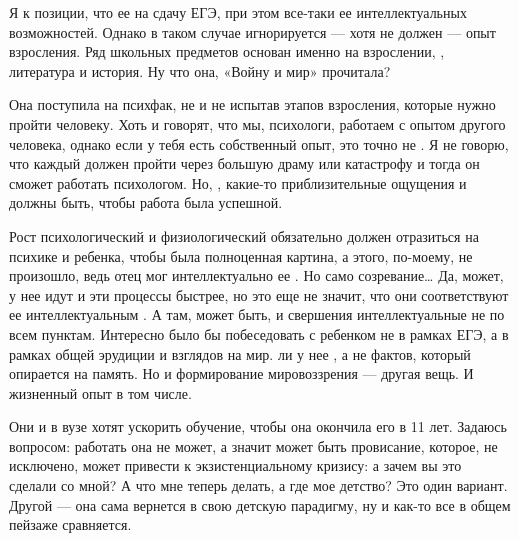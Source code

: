 Я  к позиции, что ее  на сдачу ЕГЭ, при этом  все-таки ее интеллектуальных возможностей. Однако в таком случае игнорируется --- хотя не должен --- опыт взросления. Ряд школьных предметов основан именно на  взрослении, , литература и история. Ну что она, «Войну и мир» прочитала?

Она поступила на психфак, не  и не испытав этапов взросления, которые нужно пройти человеку. Хоть и говорят, что мы, психологи, работаем с опытом другого человека, однако если у тебя есть собственный опыт, это точно не . Я не говорю, что каждый должен пройти через большую драму или катастрофу и тогда он сможет работать психологом. Но, , какие-то приблизительные ощущения и  должны быть, чтобы работа была успешной.

Рост психологический и физиологический обязательно должен отразиться на психике и  ребенка, чтобы была полноценная картина, а этого, по-моему, не произошло, ведь отец мог интеллектуально ее . Но само созревание\dots{}  Да, может, у нее идут и эти процессы быстрее, но это еще не значит, что они соответствуют ее интеллектуальным . А там, может быть, и свершения интеллектуальные не по всем пунктам. Интересно было бы побеседовать с ребенком не в рамках ЕГЭ, а в рамках общей эрудиции и взглядов на мир.  ли у нее , а не  фактов, который опирается на память. Но  и формирование мировоззрения --- другая вещь. И жизненный опыт в том числе.

Они и в вузе хотят ускорить обучение, чтобы она окончила его в 11 лет. Задаюсь вопросом: работать она не может, а значит может быть провисание, которое, не исключено, может привести к экзистенциальному кризису: а зачем вы это сделали со мной? А что мне теперь делать, а где мое детство? Это один вариант. Другой --- она сама вернется в свою детскую парадигму, ну и как-то все в общем пейзаже сравняется.

